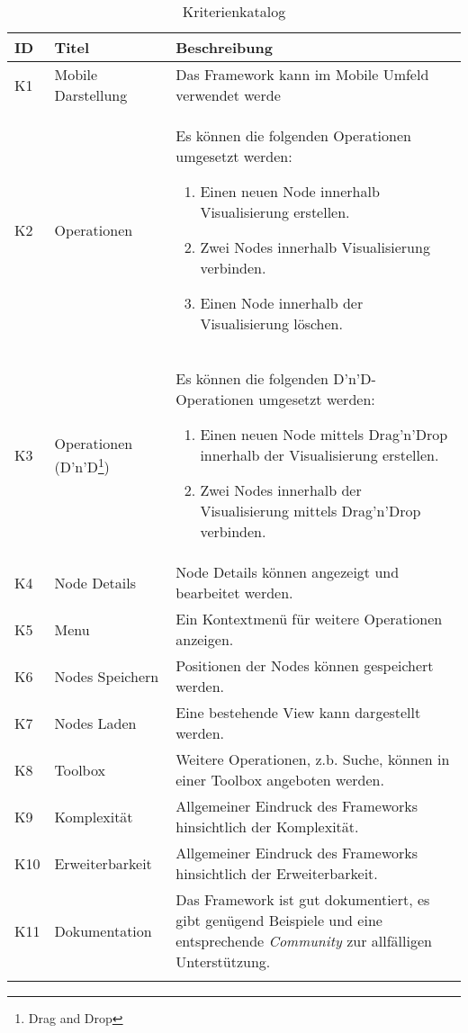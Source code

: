 \begin{longtable}{|p{1cm}| p{3cm} | p{8.1cm}|}
  \hline
    ID & Titel &  Beschreibung \\\hline
    K1 & Mobile Darstellung & Das Framework kann im Mobile Umfeld verwendet werde\\\hline
    K2 & Operationen & Es können die folgenden Operationen umgesetzt werden:
        \begin{enumerate}
          \item Einen neuen Node innerhalb Visualisierung erstellen.
          \item Zwei Nodes innerhalb Visualisierung verbinden.
          \item Einen Node innerhalb der Visualisierung löschen.
        \end{enumerate} \\\hline
    K3 & Operationen (D'n'D\footnote{Drag and Drop}) & Es können die folgenden D'n'D-Operationen umgesetzt werden:
        \begin{enumerate}
          \item Einen neuen Node mittels Drag'n'Drop innerhalb der Visualisierung erstellen.
          \item Zwei Nodes innerhalb der Visualisierung mittels Drag'n'Drop verbinden.
        \end{enumerate} \\\hline
    K4 & Node Details & Node Details können angezeigt und bearbeitet werden.\\\hline
    K5 & Menu & Ein Kontextmenü für weitere Operationen anzeigen.\\\hline
    K6 & Nodes Speichern & Positionen der Nodes können gespeichert werden.\\\hline
    K7 & Nodes Laden & Eine bestehende View kann dargestellt werden.\\\hline
    K8 & Toolbox & Weitere Operationen, z.b. Suche, können in einer Toolbox angeboten werden.\\\hline
    K9 & Komplexität & Allgemeiner Eindruck des Frameworks hinsichtlich der Komplexität.\\\hline
    K10 & Erweiterbarkeit & Allgemeiner Eindruck des Frameworks hinsichtlich der Erweiterbarkeit.\\\hline
    K11 & Dokumentation & Das Framework ist gut dokumentiert, es gibt genügend Beispiele und eine entsprechende \textit{Community} zur allfälligen Unterstützung.\\\hline
    \caption{Kriterienkatalog}
  \label{tab:kriterien-katalog}
\end{longtable}
